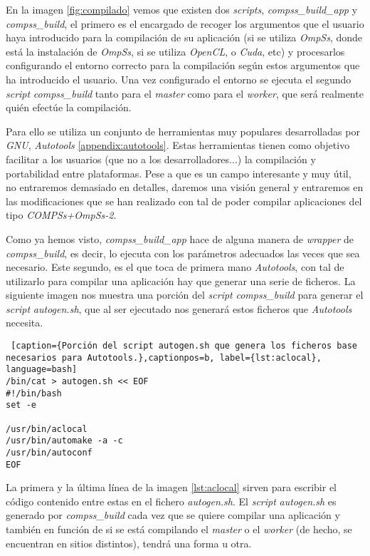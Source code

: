 En la imagen \ref{fig:compilado} vemos que existen dos \textit{scripts}, \textit{compss\_build\_app} y \textit{compss\_build}, el primero es el encargado de recoger los argumentos que el usuario haya introducido para la compilación de su aplicación (si se utiliza \textit{OmpSs}, donde está la instalación de \textit{OmpSs}, si se utiliza \textit{OpenCL}, o \textit{Cuda}, etc) y procesarlos configurando el entorno correcto para la compilación según estos argumentos que ha introducido el usuario. Una vez configurado el entorno se ejecuta el segundo \textit{script} \textit{compss\_build} tanto para el \textit{master} como para el \textit{worker}, que será realmente quién efectúe la compilación. 
\par\bigskip
Para ello se utiliza un conjunto de herramientas muy populares desarrolladas por \textit{GNU},  \textit{Autotools} \ref{appendix:autotools}. Estas herramientas tienen como objetivo facilitar a los usuarios (que no a los desarrolladores...) la compilación y portabilidad entre plataformas. Pese a que es un campo interesante y muy útil, no entraremos demasiado en detalles, daremos una visión general y entraremos en las modificaciones que se han realizado con tal de poder compilar aplicaciones del tipo \textit{COMPSs+OmpSs-2}. 
\par\bigskip
Como ya hemos visto, \textit{compss\_build\_app} hace de alguna manera de \textit{wrapper} de \textit{compss\_build}, es decir, lo ejecuta con los parámetros adecuados las veces que sea necesario. Este segundo, es el que toca de primera mano \textit{Autotools}, con tal de utilizarlo para compilar una aplicación hay que generar una serie de ficheros. La siguiente imagen nos muestra una porción del \textit{script}  \textit{compss\_build} para generar el \textit{script} \textit{autogen.sh}, que al ser ejecutado nos generará estos ficheros que \textit{Autotools} necesita.
\smallskip

\begin{lstlisting} [caption={Porción del script autogen.sh que genera los ficheros base necesarios para Autotools.},captionpos=b, label={lst:aclocal}, language=bash]
/bin/cat > autogen.sh << EOF
#!/bin/bash
set -e

/usr/bin/aclocal
/usr/bin/automake -a -c
/usr/bin/autoconf
EOF       
\end{lstlisting}

La primera y la última línea de la imagen \ref{lst:aclocal} sirven para escribir el código contenido entre estas en el fichero \textit{autogen.sh}. El \textit{script} \textit{autogen.sh} es generado por \textit{compss\_build} cada vez que se quiere compilar una aplicación y también en función de si se está compilando el \textit{master} o el \textit{worker} (de hecho, se encuentran en sitios distintos), tendrá una forma u otra. 
\par\smallskip


